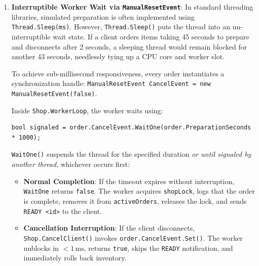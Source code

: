 \documentclass[11pt,a4paper]{article}
\begin{document}
\begin{enumerate}
    \item \textbf{Interruptible Worker Wait via \texttt{ManualResetEvent}}:
    In standard threading libraries, simulated preparation is often implemented using \texttt{Thread.Sleep(ms)}. However, \texttt{Thread.Sleep()} puts the thread into an un-interruptible wait state. If a client orders items taking 45 seconds to prepare and disconnects after 2 seconds, a sleeping thread would remain blocked for another 43 seconds, needlessly tying up a CPU core and worker slot.
    
    To achieve sub-millisecond responsiveness, every order instantiates a synchronization handle: \texttt{ManualResetEvent CancelEvent = new ManualResetEvent(false)}.
    
    Inside \texttt{Shop.WorkerLoop}, the worker waits using:
    \begin{lstlisting}[language={[Sharp]C}]
bool signaled = order.CancelEvent.WaitOne(order.PreparationSeconds * 1000);
    \end{lstlisting}
    \texttt{WaitOne()} suspends the thread for the specified duration \textit{or until signaled by another thread}, whichever occurs first:
    \begin{itemize}
        \item \textbf{Normal Completion}: If the timeout expires without interruption, \texttt{WaitOne} returns \texttt{false}. The worker acquires \texttt{shopLock}, logs that the order is complete, removes it from \texttt{activeOrders}, releases the lock, and sends \texttt{READY <id>} to the client.
        \item \textbf{Cancellation Interruption}: If the client disconnects, \texttt{Shop.CancelClient()} invokes \texttt{order.CancelEvent.Set()}. The worker unblocks in $< 1\,\text{ms}$, returns \texttt{true}, skips the \texttt{READY} notification, and immediately rolls back inventory.
    \end{itemize}


\end{enumerate}
\end{document}

